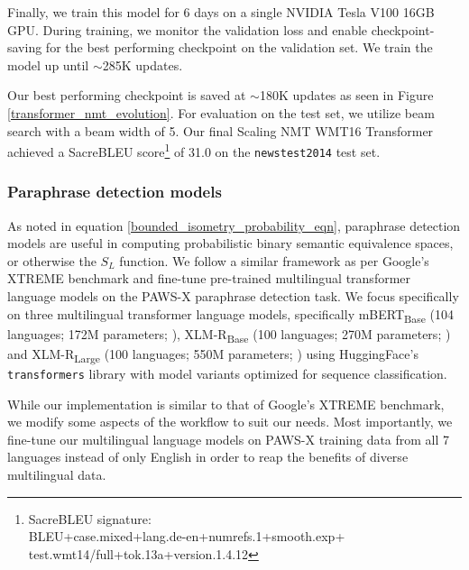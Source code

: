 \documentclass[11pt,a4paper]{article}
\begin{document}
Finally, we train this model for 6 days on a single NVIDIA Tesla V100 16GB GPU. During training, we monitor the validation loss and enable checkpoint-saving for the best performing checkpoint on the validation set. We train the model up until $\sim$285K updates.

Our best performing checkpoint is saved at $\sim$180K updates as seen in Figure \ref{transformer_nmt_evolution}. For evaluation on the test set, we utilize beam search with a beam width of 5. Our final Scaling NMT WMT16 Transformer achieved a SacreBLEU \cite{post-2018-call} score\footnote{\footnotesize SacreBLEU signature:\\BLEU+case.mixed+lang.de\nobreakdash-en+numrefs.1+smooth.exp+\\test.wmt14/full+tok.13a+version.1.4.12} of 31.0 on the \texttt{newstest2014} test set.

\subsubsection{Paraphrase detection models}

As noted in equation \ref{bounded_isometry_probability_eqn}, paraphrase detection models are useful in computing probabilistic binary semantic equivalence spaces, or otherwise the $S_L$ function. We follow a similar framework as per Google's XTREME benchmark \cite{hu2020xtreme} and fine-tune pre-trained multilingual transformer language models on the PAWS-X paraphrase detection task. We focus specifically on three multilingual transformer language models, specifically mBERT\textsubscript{Base} (104 languages; 172M parameters; \citealt{devlin-etal-2019-bert}), XLM-R\textsubscript{Base} (100 languages; 270M parameters; \citealt{conneau2019unsupervised}) and XLM-R\textsubscript{Large} (100 languages; 550M parameters; \citealt{conneau2019unsupervised}) using HuggingFace's \texttt{transformers} library \cite{Wolf2019HuggingFacesTS} with model variants optimized for sequence classification.

While our implementation is similar to that of Google's XTREME benchmark, we modify some aspects of the workflow to suit our needs. Most importantly, we fine-tune our multilingual language models on PAWS-X training data from all 7 languages instead of only English in order to reap the benefits of diverse multilingual data.
\end{document}
